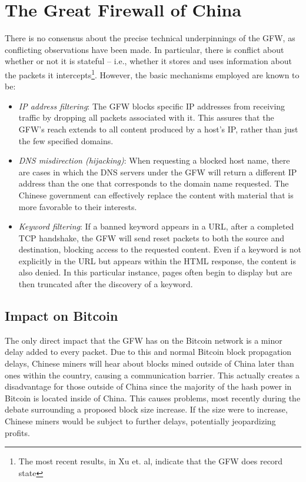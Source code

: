 \section{The Great Firewall of China}
There is no consensus about the precise technical underpinnings of the GFW, as conflicting observations have been made. In particular, there is conflict about whether or not it is stateful -- i.e., whether it stores and uses information about the packets it intercepts\footnote{The most recent results, in Xu et. al\cite{Xu2011}, indicate that the GFW does record state}. However, the basic mechanisms employed are known to be\cite{GFWStanford}:

\begin{itemize}
\item \textit{IP address filtering}:
The GFW blocks specific IP addresses from receiving traffic by dropping all packets associated with it. This assures that the GFW's reach extends to all content produced by a host's IP, rather than just the few specified domains.

\item \textit{DNS misdirection (hijacking)}:
When requesting a blocked host name, there are cases in which the DNS servers under the GFW will return a different IP address than the one that corresponds to the domain name requested. The Chinese government can effectively replace the content with material that is more favorable to their interests.

\item \textit{Keyword filtering}:
If a banned keyword appears in a URL, after a completed TCP handshake, the GFW will send reset packets to both the source and destination, blocking access to the requested content. Even if a keyword is not explicitly in the URL but appears within the HTML response, the content is also denied. In this particular instance, pages often begin to display but are then truncated after the discovery of a keyword.
\end{itemize}

\subsection{Impact on Bitcoin}
The only direct impact that the GFW has on the Bitcoin network is a minor delay added to every packet. Due to this and normal Bitcoin block propagation delays, Chinese miners will hear about blocks mined outside of China later than ones within the country, causing a communication barrier. This actually creates a disadvantage for those outside of China since the majority of the hash power in Bitcoin is located inside of China. This causes problems, most recently during the debate surrounding a proposed block size increase. If the size were to increase, Chinese miners would be subject to further delays, potentially jeopardizing profits. \cite{nasdaq}